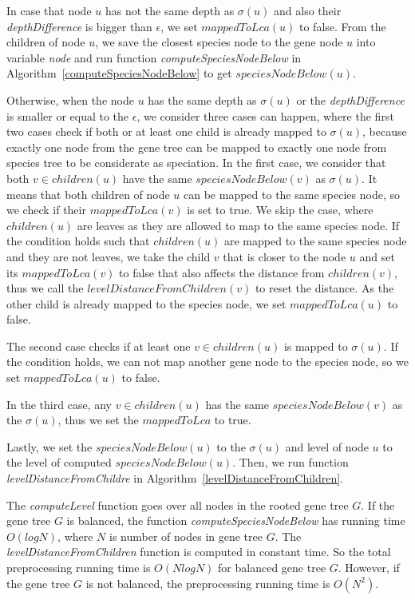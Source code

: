 In case that node $u$ has not the same depth as $\sigma(u)$ and also their \emph{depthDifference} is bigger than $\epsilon$, we set $mappedToLca(u)$ to false. From the children of node $u$, we save the closest species node to the gene node $u$ into variable \emph{node} and run function \emph{computeSpeciesNodeBelow} in Algorithm~\ref{computeSpeciesNodeBelow} to get $speciesNodeBelow(u)$. 

Otherwise, when the node $u$ has the same depth as $\sigma(u)$ or the \emph{depthDifference} is smaller or equal to the $\epsilon$, we consider three cases can happen, where the first two cases check if both or at least one child is already mapped to $\sigma(u)$, because exactly one node from the gene tree can be mapped to exactly one node from species tree to be considerate as speciation. In the first case, we consider that both $v \in children(u)$ have the same $speciesNodeBelow(v)$ as $\sigma(u)$. It means that both children of node $u$ can be mapped to the same species node, so we check if their $mappedToLca(v)$ is set to true. We skip the case, where $children(u)$ are leaves as they are allowed to map to the same species node. If the condition holds such that $children(u)$ are mapped to the same species node and they are not leaves, we take the child $v$ that is closer to the node $u$ and set its $mappedToLca(v)$ to false that also affects the distance from $children(v)$, thus we call the $levelDistanceFromChildren(v)$ to reset the distance. As the other child is already mapped to the species node, we set $mappedToLca(u)$ to false.

The second case checks if at least one $v \in children(u)$ is mapped to $\sigma(u)$. If the condition holds, we can not map another gene node to the species node, so we set $mappedToLca(u)$ to false. 

In the third case, any $v \in children (u)$ has the same $speciesNodeBelow(v)$ as the $\sigma(u)$, thus we set the $mappedToLca$ to true.

Lastly, we set the $speciesNodeBelow(u)$ to the $\sigma(u)$ and level of node $u$ to the level of computed $speciesNodeBelow(u)$. Then, we run function \emph{levelDistanceFromChildre} in Algorithm~\ref{levelDistanceFromChildren}.

The \emph{computeLevel} function goes over all nodes in the rooted gene tree $G$. If the gene tree $G$ is balanced, the function \emph{computeSpeciesNodeBelow} has running time $O(log N)$, where $N$ is number of nodes in gene tree $G$. The \emph{levelDistanceFromChildren} function is computed in constant time. So the total preprocessing running time is $O(N log N)$ for balanced gene tree $G$. However, if the gene tree $G$ is not balanced, the preprocessing running time is $O(N^2)$.

